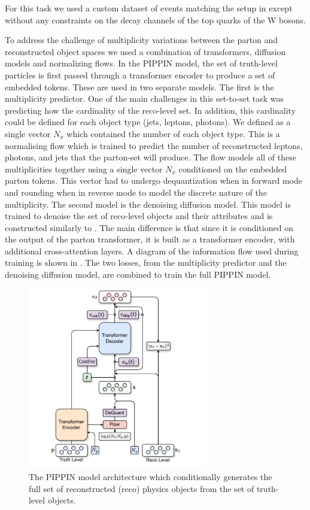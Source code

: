 For this task we used a custom dataset of \ttbar events matching the setup in  except without any constraints on the decay channels of the top quarks of the W bosons.

To address the challenge of multiplicity variations between the parton and reconstructed object spaces we used a combination of transformers, diffusion models and normalizing flows.
In the PIPPIN model, the set of truth-level particles is first passed through a transformer encoder to produce a set of embedded tokens.
These are used in two separate models.
The first is the multiplicity predictor.
One of the main challenges in this set-to-set task was predicting how the cardinality of the reco-level set.
In addition, this cardinality could be defined for each object type (jets, leptons, photons).
We defined as a single vector $N_x$ which contained the number of each object type.
This is a normalising flow which is trained to predict the number of reconstructed leptons, photons, and jets that the parton-set will produce.
The flow models all of these multiplicities together using a single vector $N_x$ conditioned on the embedded parton tokens.
This vector had to undergo dequantization when in forward mode and rounding when in reverse mode to model the discrete nature of the multiplicity.
The second model is the denoising diffusion model.
This model is trained to denoise the set of reco-level objects and their attributes and is constructed similarly to \pcdroid.
The main difference is that since it is conditioned on the output of the parton transformer, it is built as a transformer encoder, with additional cross-attention layers.
A diagram of the information flow used during training is shown in .
The two losses, from the multiplicity predictor and the denoising diffusion model, are combined to train the full PIPPIN model.

\begin{figure}[tb]
    \centering
    \includegraphics[width=0.70\textwidth]{Figures/jet_generation/PIPPIN.pdf}
    \caption{
        The PIPPIN model architecture which conditionally generates the full set of reconstructed (reco) physics objects from the set of truth-level objects.
    }
    \label{fig:pippin}
\end{figure}

